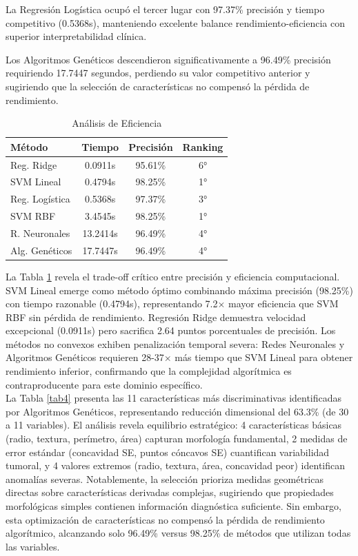\documentclass[conference]{IEEEtran}
\begin{document}
La Regresión Logística ocupó el tercer lugar con 97.37\% precisión y tiempo competitivo (0.5368s), manteniendo excelente balance rendimiento-eficiencia con superior interpretabilidad clínica.

Los Algoritmos Genéticos descendieron significativamente a 96.49\% precisión requiriendo 17.7447 segundos, perdiendo su valor competitivo anterior y sugiriendo que la selección de características no compensó la pérdida de rendimiento.

\begin{table}[htbp]
\caption{Análisis de Eficiencia}
\begin{center}
\footnotesize
\begin{tabular}{|l|c|c|c|}
\hline
\textbf{Método} & \textbf{Tiempo} & \textbf{Precisión} & \textbf{Ranking} \\
\hline
Reg. Ridge & 0.0911s & 95.61\% & 6° \\
\hline
SVM Lineal & 0.4794s & 98.25\% & 1° \\
\hline
Reg. Logística & 0.5368s & 97.37\% & 3° \\
\hline
SVM RBF & 3.4545s & 98.25\% & 1° \\
\hline
R. Neuronales & 13.2414s & 96.49\% & 4° \\
\hline
Alg. Genéticos & 17.7447s & 96.49\% & 4° \\
\hline
\end{tabular}
\label{tab3}
\end{center}
\end{table}

La Tabla \ref{tab3} revela el trade-off crítico entre precisión y eficiencia computacional. SVM Lineal emerge como método óptimo combinando máxima precisión (98.25\%) con tiempo razonable (0.4794s), representando 7.2$\times$ mayor eficiencia que SVM RBF sin pérdida de rendimiento. Regresión Ridge demuestra velocidad excepcional (0.0911s) pero sacrifica 2.64 puntos porcentuales de precisión. Los métodos no convexos exhiben penalización temporal severa: Redes Neuronales y Algoritmos Genéticos requieren 28-37$\times$ más tiempo que SVM Lineal para obtener rendimiento inferior, confirmando que la complejidad algorítmica es contraproducente para este dominio específico.\\

La Tabla \ref{tab4} presenta las 11 características más discriminativas identificadas por Algoritmos Genéticos, representando reducción dimensional del 63.3\% (de 30 a 11 variables). El análisis revela equilibrio estratégico: 4 características básicas (radio, textura, perímetro, área) capturan morfología fundamental, 2 medidas de error estándar (concavidad SE, puntos cóncavos SE) cuantifican variabilidad tumoral, y 4 valores extremos (radio, textura, área, concavidad peor) identifican anomalías severas. Notablemente, la selección prioriza medidas geométricas directas sobre características derivadas complejas, sugiriendo que propiedades morfológicas simples contienen información diagnóstica suficiente. Sin embargo, esta optimización de características no compensó la pérdida de rendimiento algorítmico, alcanzando solo 96.49\% versus 98.25\% de métodos que utilizan todas las variables.
\end{document}
